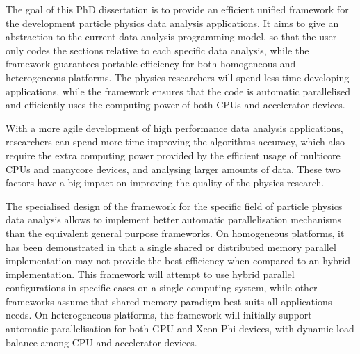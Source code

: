 The goal of this PhD dissertation is to provide an efficient unified framework for the development particle physics data analysis applications. It aims to give an abstraction to the current data analysis programming model, so that the user only codes the sections relative to each specific data analysis, while the framework guarantees portable efficiency for both homogeneous and heterogeneous platforms. The physics researchers will spend less time developing applications, while the framework ensures that the code is automatic parallelised and efficiently uses the computing power of both CPUs and accelerator devices.

With a more agile development of high performance data analysis applications, researchers can spend more time improving the algorithms accuracy, which also require the extra computing power provided by the efficient usage of multicore CPUs and manycore devices, and analysing larger amounts of data. These two factors have a big impact on improving the quality of the physics research.

The specialised design of the framework for the specific field of particle physics data analysis allows to implement better automatic parallelisation mechanisms than the equivalent general purpose frameworks. On homogeneous platforms, it has been demonstrated in \cite{paperAMP,Msc:AMP} that a single shared or distributed memory parallel implementation may not provide the best efficiency when compared to an hybrid implementation. This framework will attempt to use hybrid parallel configurations in specific cases on a single computing system, while other frameworks assume that shared memory paradigm best suits all applications needs. On heterogeneous platforms, the framework will initially support automatic parallelisation for both \nvidia GPU and \intel Xeon Phi devices, with dynamic load balance among CPU and accelerator devices.
